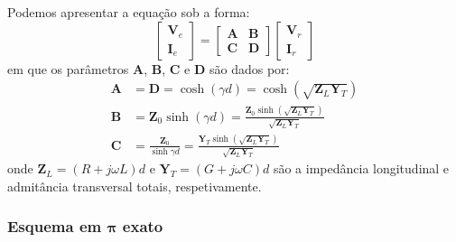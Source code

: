 Podemos apresentar a equação sob a forma:
$$
    \begin{bmatrix}
        \mathbf{V}_e \\[6pt]
        \mathbf{I}_e
    \end{bmatrix}
    =
    \begin{bmatrix}
        \mathbf{A} & \mathbf{B} \\[6pt]
        \mathbf{C} & \mathbf{D}
    \end{bmatrix}
    \begin{bmatrix}
        \mathbf{V}_r \\[6pt]
        \mathbf{I}_r
    \end{bmatrix}
$$
em que os parâmetros $\mathbf{A}$, $\mathbf{B}$, $\mathbf{C}$ e $\mathbf{D}$ são dados por:
$$
    \begin{aligned}
        \mathbf{A} &= \mathbf{D} = \cosh(\gamma d) = \cosh(\sqrt{\mathbf{Z}_L \mathbf{Y}_T}) \\
        \mathbf{B} &= \mathbf{Z}_0 \sinh(\gamma d) = \frac{\mathbf{Z}_0 \sinh(\sqrt{\mathbf{Z}_L \mathbf{Y}_T})}{\sqrt{\mathbf{Z}_L \mathbf{Y}_T}} \\
        \mathbf{C} &= \frac{\mathbf{Z}_0}{\sinh{\gamma d}} = \frac{\mathbf{Y}_T \sinh(\sqrt{\mathbf{Z}_L \mathbf{Y}_T})}{\sqrt{\mathbf{Z}_L \mathbf{Y}_T}}
    \end{aligned}
$$
onde $\mathbf{Z}_L = (R + j\omega L)d$ e $\mathbf{Y}_T = (G + j\omega C)d$ são a impedância longitudinal e admitância transversal totais, respetivamente.

\subsubsection{Esquema em $\pmb{\pi}$ exato}

\begin{figure}[H]
    \centering
    \caption{}
    \label{fig:linha-transmissao-esq-exato}
\end{figure}

